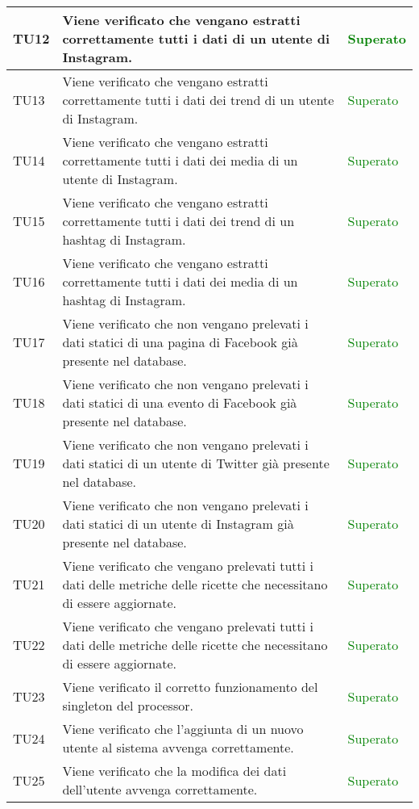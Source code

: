 \begin{center}
\begin{longtable}{| p{2cm} | p{8cm} | p{2.5cm} |}
					\hline
					TU12 & Viene verificato che vengano estratti correttamente tutti i dati di un utente di Instagram. & \textcolor{green}{Superato}\\
					\hline
					TU13 & Viene verificato che vengano estratti correttamente tutti i dati dei trend di un utente di Instagram. & \textcolor{green}{Superato}\\
					\hline
					TU14 & Viene verificato che vengano estratti correttamente tutti i dati dei media di un utente di Instagram. & \textcolor{green}{Superato}\\
					\hline
					TU15 & Viene verificato che vengano estratti correttamente tutti i dati dei trend di un hashtag di Instagram. & \textcolor{green}{Superato}\\
					\hline
					TU16 & Viene verificato che vengano estratti correttamente tutti i dati dei media di un hashtag di Instagram. & \textcolor{green}{Superato}\\
					\hline
					TU17 & Viene verificato che non vengano prelevati i dati statici di una pagina di Facebook già presente nel database. & \textcolor{green}{Superato}\\
					\hline
					TU18 & Viene verificato che non vengano prelevati i dati statici di una evento di Facebook già presente nel database. & \textcolor{green}{Superato}\\
					\hline
					TU19 & Viene verificato che non vengano prelevati i dati statici di un utente di Twitter già presente nel database. & \textcolor{green}{Superato}\\
					\hline
					TU20 & Viene verificato che non vengano prelevati i dati statici di un utente di Instagram già presente nel database. & \textcolor{green}{Superato}\\
					\hline
					TU21 & Viene verificato che vengano prelevati tutti i dati delle metriche delle ricette che necessitano di essere aggiornate. & \textcolor{green}{Superato}\\
					\hline
					TU22 & Viene verificato che vengano prelevati tutti i dati delle metriche delle ricette che necessitano di essere aggiornate. & \textcolor{green}{Superato}\\
					\hline
					TU23 & Viene verificato il corretto funzionamento del singleton del processor. & \textcolor{green}{Superato}\\
					\hline
					TU24 & Viene verificato che l'aggiunta di un nuovo utente al sistema avvenga correttamente. & \textcolor{green}{Superato}\\
					\hline
					TU25 & Viene verificato che la modifica dei dati dell'utente avvenga correttamente. & \textcolor{green}{Superato}\\

\end{longtable}
\end{center}
